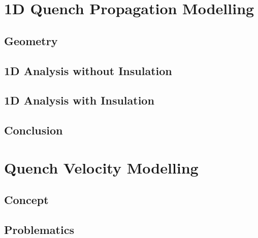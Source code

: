 \documentclass{article}
\begin{document}
\clearpage
\section{1D Quench Propagation Modelling}
\label{section: 1d_quench_propagation_modelling}


\subsection{Geometry}
\label{subsection: 1d_quench_propagation_geometry}


\subsection{1D Analysis without Insulation}
\label{subsection: 1D_quench_propagation_no_insulation}


\subsection{1D Analysis with Insulation}
\label{subsection: 1D_quench_propagation_with_insulation}


\subsection{Conclusion}
\label{subsection: 1D_quench_propagation_conclusions}

 
\clearpage
\section{Quench Velocity Modelling}
\label{section:quench_velocity_modelling}

\subsection{Concept}
\label{subsection:quench_velocity_concept}


\subsection{Problematics}
\label{subsection:quench_velocity_problematics}

\end{document}

